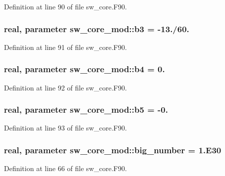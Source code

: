 Definition at line 90 of file sw\-\_\-core.\-F90.

\subsubsection[{b3}]{\setlength{\rightskip}{0pt plus 5cm}real, parameter sw\-\_\-core\-\_\-mod\-::b3 = -\/13./60.}\label{classsw__core__mod_a53d9d5f60e77227069729364bf924ddb}


Definition at line 91 of file sw\-\_\-core.\-F90.

\subsubsection[{b4}]{\setlength{\rightskip}{0pt plus 5cm}real, parameter sw\-\_\-core\-\_\-mod\-::b4 = 0.}\label{classsw__core__mod_a9f920cb428a38b9ad3294bb816b3b69a}


Definition at line 92 of file sw\-\_\-core.\-F90.

\subsubsection[{b5}]{\setlength{\rightskip}{0pt plus 5cm}real, parameter sw\-\_\-core\-\_\-mod\-::b5 = -\/0.}\label{classsw__core__mod_a8e47d06abc48dd557c6a46a38871e58a}


Definition at line 93 of file sw\-\_\-core.\-F90.

\subsubsection[{big\-\_\-number}]{\setlength{\rightskip}{0pt plus 5cm}real, parameter sw\-\_\-core\-\_\-mod\-::big\-\_\-number = 1.E30}\label{classsw__core__mod_af5edb606364e91428ef3ef7ee98d9d5e}


Definition at line 66 of file sw\-\_\-core.\-F90.

